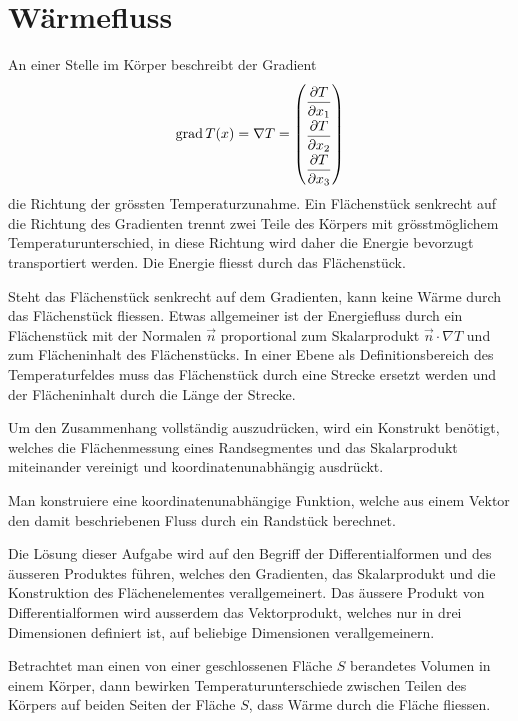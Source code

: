 %
%
%

%
%
\section{Wärmefluss
\label{buch:fallstudie:waermefluss}}
An einer Stelle im Körper beschreibt der Gradient
\[
\operatorname{grad} T(x)
=
\nabla T
=
\renewcommand{\arraystretch}{1.9}
\begin{pmatrix}
\displaystyle \frac{\partial T}{\partial x_1}\\
\displaystyle \frac{\partial T}{\partial x_2}\\
\displaystyle \frac{\partial T}{\partial x_3}
\end{pmatrix}
\]
die Richtung der grössten Temperaturzunahme.
Ein Flächenstück senkrecht auf die Richtung des Gradienten
trennt zwei Teile des Körpers mit grösstmöglichem Temperaturunterschied,
in diese Richtung wird daher die Energie bevorzugt transportiert werden.
Die Energie fliesst durch das Flächenstück.

Steht das Flächenstück senkrecht auf dem Gradienten, kann keine
Wärme durch das Flächenstück fliessen.
Etwas allgemeiner ist der Energiefluss durch ein Flächenstück mit der
Normalen $\vec{n}$ proportional zum Skalarprodukt $\vec{n}\cdot\nabla T$
und zum Flächeninhalt des Flächenstücks.
In einer Ebene als Definitionsbereich des Temperaturfeldes muss
das Flächenstück durch eine Strecke ersetzt werden und der Flächeninhalt
durch die Länge der Strecke.

Um den Zusammenhang vollständig auszudrücken, wird ein Konstrukt 
benötigt, welches die Flächenmessung eines Randsegmentes und das
Skalarprodukt miteinander vereinigt und koordinatenunabhängig
ausdrückt.

\begin{aufgabe}
Man konstruiere eine koordinatenunabhängige Funktion, welche aus einem
Vektor den damit beschriebenen Fluss durch ein Randstück berechnet.
\end{aufgabe}

Die Lösung dieser Aufgabe wird auf den Begriff der Differentialformen
und des äusseren Produktes führen, welches den Gradienten, das Skalarprodukt
und die Konstruktion des Flächenelementes verallgemeinert.
Das äussere Produkt von Differentialformen wird ausserdem das
Vektorprodukt, welches nur in drei Dimensionen definiert ist, auf beliebige
Dimensionen verallgemeinern.

Betrachtet man einen von einer geschlossenen Fläche $S$ berandetes
Volumen in einem Körper, dann bewirken Temperaturunterschiede zwischen
Teilen des Körpers auf beiden Seiten der Fläche $S$, dass Wärme durch
die Fläche fliessen.

